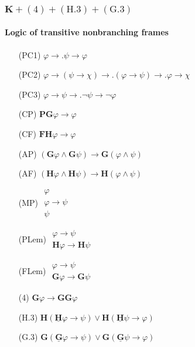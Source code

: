 \documentclass[xcolor=x11names]{beamer}
\newcommand{\FD}{\mathbf F}
\newcommand{\FB}{\mathbf G}
\newcommand{\PD}{\mathbf P}
\newcommand{\PB}{\mathbf H}
\newcommand{\FBDot}{\underline{\mathbf G}}
\newcommand{\PBDot}{\underline{\mathbf H}}
\newcommand{\lrule}[3][c]{\begin{array}{#1} #2  \\  \hline #3 \end{array}}
\newcommand{\lthen}{\rightarrow}
\begin{document}
\begin{frame}[t]
\frametitle{$\mathbf K+ (4)+(\mathrm H.3)+ (\mathrm G.3)$}
\framesubtitle{Logic of transitive nonbranching frames}
\footnotesize
\begin{minipage}[t]{5.78cm}
\begin{itemize}
\item[(PC1)] $\varphi \lthen .\psi \lthen \varphi$
\item[(PC2)] $\varphi\lthen (\psi \lthen \chi) \lthen\!\!. (\varphi \lthen \psi) \lthen\!\! . \varphi \lthen \chi$
\item[(PC3)] $\varphi \lthen \psi \lthen .\lnot \psi \lthen \lnot \varphi$
\item[(CP)] $\PD\FB\varphi \lthen \varphi $
\item[(CF)] $\FD\PB\varphi \lthen \varphi$
\item[(AP)] $(\FB\varphi \land \FB \psi )\lthen \FB(\varphi \land \psi )$
\item[(AF)] $(\PB\varphi \land \PB \psi )\lthen \PB(\varphi \land \psi )$
\item[(MP)] $\lrule {\varphi \\ \varphi \lthen \psi}{\psi}$
\item[(PLem)] $\lrule{\varphi\lthen \psi}{\PB\varphi \lthen \PB\psi}$
\item[(FLem)] $\lrule{\varphi\lthen \psi}{\FB\varphi \lthen \FB\psi}$
\end{itemize}
\end{minipage}\quad
\begin{minipage}[t]{4.5cm}
\begin{itemize}
\item[(4)] $\FB\varphi\lthen \FB\FB\varphi$
\item[(H.3)] $\PB(\PBDot \varphi\lthen \psi ) \lor \PB(\PBDot \psi\lthen \varphi )$
\item[(G.3)] $\FB(\FBDot \varphi\lthen \psi ) \lor \FB(\FBDot \psi\lthen \varphi )$
\end{itemize}
\end{minipage}
\end{frame}
\end{document}
